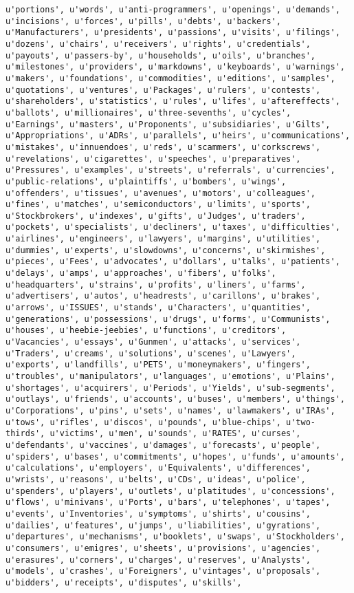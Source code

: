 \documentclass{article}
\begin{document}
\begin{Verbatim}[commandchars=\\\{\}]
u'portions', u'words', u'anti-programmers', u'openings', u'demands', u'incisions', u'forces', u'pills', u'debts', u'backers', u'Manufacturers', u'presidents', u'passions', u'visits', u'filings', u'dozens', u'chairs', u'receivers', u'rights', u'credentials', u'payouts', u'passers-by', u'households', u'oils', u'branches', u'milestones', u'providers', u'markdowns', u'keyboards', u'warnings', u'makers', u'foundations', u'commodities', u'editions', u'samples', u'quotations', u'ventures', u'Packages', u'rulers', u'contests', u'shareholders', u'statistics', u'rules', u'lifes', u'aftereffects', u'ballots', u'millionaires', u'three-sevenths', u'cycles', u'Earnings', u'masters', u'Proponents', u'subsidiaries', u'Gilts', u'Appropriations', u'ADRs', u'parallels', u'heirs', u'communications', u'mistakes', u'innuendoes', u'reds', u'scammers', u'corkscrews', u'revelations', u'cigarettes', u'speeches', u'preparatives', u'Pressures', u'examples', u'streets', u'referrals', u'currencies', u'public-relations', u'plaintiffs', u'bombers', u'wings', u'offenders', u'tissues', u'avenues', u'motors', u'colleagues', u'fines', u'matches', u'semiconductors', u'limits', u'sports', u'Stockbrokers', u'indexes', u'gifts', u'Judges', u'traders', u'pockets', u'specialists', u'decliners', u'taxes', u'difficulties', u'airlines', u'engineers', u'lawyers', u'margins', u'utilities', u'dummies', u'experts', u'slowdowns', u'concerns', u'skirmishes', u'pieces', u'Fees', u'advocates', u'dollars', u'talks', u'patients', u'delays', u'amps', u'approaches', u'fibers', u'folks', u'headquarters', u'strains', u'profits', u'liners', u'farms', u'advertisers', u'autos', u'headrests', u'carillons', u'brakes', u'arrows', u'ISSUES', u'stands', u'Characters', u'quantities', u'generations', u'possessions', u'drugs', u'forms', u'Communists', u'houses', u'heebie-jeebies', u'functions', u'creditors', u'Vacancies', u'essays', u'Gunmen', u'attacks', u'services', u'Traders', u'creams', u'solutions', u'scenes', u'Lawyers', u'exports', u'landfills', u'PETS', u'moneymakers', u'fingers', u'troubles', u'manipulators', u'languages', u'emotions', u'Plains', u'shortages', u'acquirers', u'Periods', u'Yields', u'sub-segments', u'outlays', u'friends', u'accounts', u'buses', u'members', u'things', u'Corporations', u'pins', u'sets', u'names', u'lawmakers', u'IRAs', u'tows', u'rifles', u'discos', u'pounds', u'blue-chips', u'two-thirds', u'victims', u'men', u'sounds', u'RATES', u'curses', u'defendants', u'vaccines', u'damages', u'forecasts', u'people', u'spiders', u'bases', u'commitments', u'hopes', u'funds', u'amounts', u'calculations', u'employers', u'Equivalents', u'differences', u'wrists', u'reasons', u'belts', u'CDs', u'ideas', u'police', u'spenders', u'players', u'outlets', u'platitudes', u'concessions', u'flows', u'minivans', u'Ports', u'bars', u'telephones', u'tapes', u'events', u'Inventories', u'symptoms', u'shirts', u'cousins', u'dailies', u'features', u'jumps', u'liabilities', u'gyrations', u'departures', u'mechanisms', u'booklets', u'swaps', u'Stockholders', u'consumers', u'emigres', u'sheets', u'provisions', u'agencies', u'erasures', u'corners', u'charges', u'reserves', u'Analysts', u'models', u'crashes', u'Foreigners', u'vintages', u'proposals', u'bidders', u'receipts', u'disputes', u'skills', 
\end{Verbatim}
\end{document}
